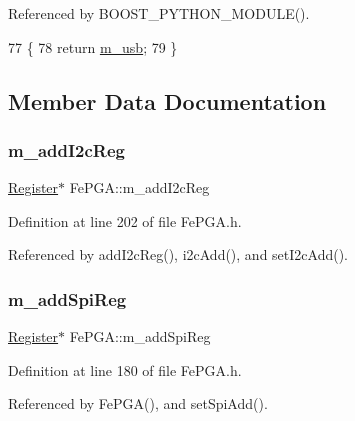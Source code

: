 Referenced by B\+O\+O\+S\+T\+\_\+\+P\+Y\+T\+H\+O\+N\+\_\+\+M\+O\+D\+U\+L\+E().


\begin{DoxyCode}
77                          \{
78     \textcolor{keywordflow}{return} \hyperlink{classFePGA_afb7947e600a66d914ee524acec3d8b1f}{m\_usb};
79   \}
\end{DoxyCode}


\subsection{Member Data Documentation}
\mbox{\label{classFePGA_af3ef3467ba803e6d3b970ea8982d6246}} 
\subsubsection{\texorpdfstring{m\+\_\+add\+I2c\+Reg}{m\_addI2cReg}}
{\footnotesize\ttfamily \hyperlink{classRegister}{Register}$\ast$ Fe\+P\+G\+A\+::m\+\_\+add\+I2c\+Reg\hspace{0.3cm}{\ttfamily [private]}}



Definition at line 202 of file Fe\+P\+G\+A.\+h.



Referenced by add\+I2c\+Reg(), i2c\+Add(), and set\+I2c\+Add().

\mbox{\label{classFePGA_a569eb8410924bec1c8279ca80dc37a6a}} 
\subsubsection{\texorpdfstring{m\+\_\+add\+Spi\+Reg}{m\_addSpiReg}}
{\footnotesize\ttfamily \hyperlink{classRegister}{Register}$\ast$ Fe\+P\+G\+A\+::m\+\_\+add\+Spi\+Reg\hspace{0.3cm}{\ttfamily [private]}}



Definition at line 180 of file Fe\+P\+G\+A.\+h.



Referenced by Fe\+P\+G\+A(), and set\+Spi\+Add().

\mbox{\label{classFePGA_a8fb76733a688dff6d91892a49a97a21f}} 
